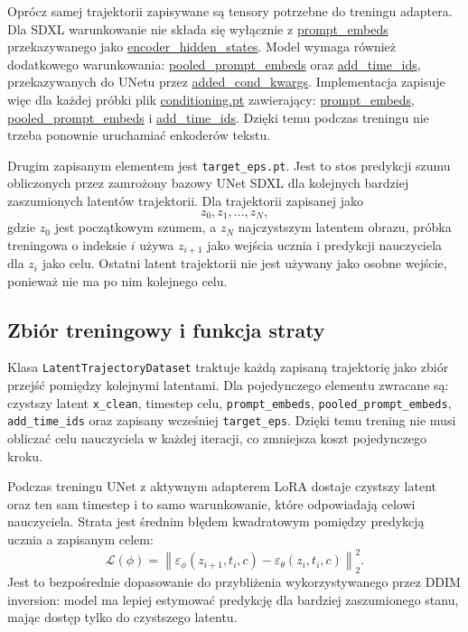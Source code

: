 \documentclass[
    left=2.5cm,
    right=2.5cm,
    top=2.5cm,
    bottom=3cm,
    bindingoffset=6mm,
    nohyphenation=false
]{szablon/eiti/sprawozdanie}
\begin{document}
Oprócz samej trajektorii zapisywane są tensory potrzebne do treningu
adaptera. Dla SDXL warunkowanie nie składa się wyłącznie z
\url{prompt\_embeds} przekazywanego jako \url{encoder\_hidden\_states}.
Model wymaga również dodatkowego warunkowania:
\url{pooled\_prompt\_embeds} oraz \url{add\_time\_ids}, przekazywanych
do UNetu przez \url{added\_cond\_kwargs}. Implementacja zapisuje więc dla
każdej próbki plik \url{conditioning.pt} zawierający:
\url{prompt\_embeds}, \url{pooled\_prompt\_embeds} i
\url{add\_time\_ids}. Dzięki temu podczas treningu nie trzeba ponownie
uruchamiać enkoderów tekstu.

Drugim zapisanym elementem jest \texttt{target\_eps.pt}. Jest to stos
predykcji szumu obliczonych przez zamrożony bazowy UNet SDXL dla kolejnych
bardziej zaszumionych latentów trajektorii. Dla trajektorii zapisanej jako
\[
    z_0, z_1, \ldots, z_N,
\]
gdzie $z_0$ jest początkowym szumem, a $z_N$ najczystszym latentem obrazu,
próbka treningowa o indeksie $i$ używa $z_{i+1}$ jako wejścia ucznia i
predykcji nauczyciela dla $z_i$ jako celu. Ostatni latent trajektorii nie
jest używany jako osobne wejście, ponieważ nie ma po nim kolejnego celu.

\subsection{Zbiór treningowy i funkcja straty}

Klasa \texttt{LatentTrajectoryDataset} traktuje każdą zapisaną trajektorię
jako zbiór przejść pomiędzy kolejnymi latentami. Dla pojedynczego elementu
zwracane są: czystszy latent \texttt{x\_clean}, timestep celu,
\texttt{prompt\_embeds}, \texttt{pooled\_prompt\_embeds},
\texttt{add\_time\_ids} oraz zapisany wcześniej \texttt{target\_eps}. Dzięki
temu trening nie musi obliczać celu nauczyciela w każdej iteracji, co
zmniejsza koszt pojedynczego kroku.

Podczas treningu UNet z aktywnym adapterem LoRA dostaje czystszy latent oraz
ten sam timestep i to samo warunkowanie, które odpowiadają celowi
nauczyciela. Strata jest średnim błędem kwadratowym pomiędzy predykcją
ucznia a zapisanym celem:
\[
    \mathcal{L}(\phi)
    =
    \left\|
        \varepsilon_{\phi}(z_{i+1}, t_i, c)
        -
        \varepsilon_{\theta}(z_i, t_i, c)
    \right\|_2^2.
\]
Jest to bezpośrednie dopasowanie do przybliżenia wykorzystywanego przez
DDIM inversion: model ma lepiej estymować predykcję dla bardziej
zaszumionego stanu, mając dostęp tylko do czystszego latentu.
\end{document}
